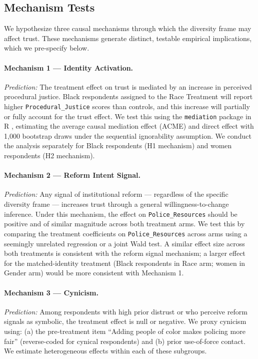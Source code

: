 \subsection{Mechanism Tests}
\label{sec:mechanisms}

We hypothesize three causal mechanisms through which the diversity frame may affect trust.
These mechanisms generate distinct, testable empirical implications, which we pre-specify below.

\paragraph{Mechanism 1 --- Identity Activation.}
\textit{Prediction:} The treatment effect on trust is mediated by an increase in perceived procedural justice.
Black respondents assigned to the Race Treatment will report higher \texttt{Procedural\_Justice} scores than controls, and this increase will partially or fully account for the trust effect.
We test this using the \texttt{mediation} package in R \citep{Tingley2014}, estimating the average causal mediation effect (ACME) and direct effect with 1,000 bootstrap draws under the sequential ignorability assumption.
We conduct the analysis separately for Black respondents (H1 mechanism) and women respondents (H2 mechanism).

\paragraph{Mechanism 2 --- Reform Intent Signal.}
\textit{Prediction:} Any signal of institutional reform --- regardless of the specific diversity frame --- increases trust through a general willingness-to-change inference.
Under this mechanism, the effect on \texttt{Police\_Resources} should be positive and of similar magnitude across both treatment arms.
We test this by comparing the treatment coefficients on \texttt{Police\_Resources} across arms using a seemingly unrelated regression or a joint Wald test.
A similar effect size across both treatments is consistent with the reform signal mechanism; a larger effect for the matched-identity treatment (Black respondents in Race arm; women in Gender arm) would be more consistent with Mechanism 1.

\paragraph{Mechanism 3 --- Cynicism.}
\textit{Prediction:} Among respondents with high prior distrust or who perceive reform signals as symbolic, the treatment effect is null or negative.
We proxy cynicism using: (a) the pre-treatment item ``Adding people of color makes policing more fair'' (reverse-coded for cynical respondents) and (b) prior use-of-force contact.
We estimate heterogeneous effects within each of these subgroups.

